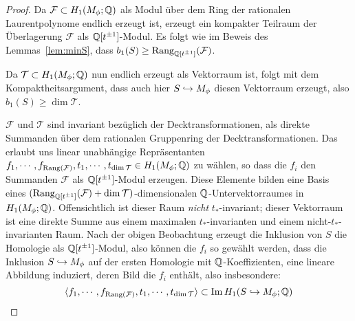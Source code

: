         \begin{proof} 
        Da $\mathcal F \subset H_1(M_\phi;\mathbb{Q})$ als Modul über dem Ring der rationalen Laurentpolynome endlich erzeugt ist, erzeugt ein kompakter Teilraum der Überlagerung $\mathcal F$ als $\mathbb{Q}[t^{\pm 1}]$-Modul. Es folgt wie im Beweis des Lemmas~\ref{lem:minS}, dass $b_1(S)\geq \operatorname{Rang}_{\mathbb{Q}[t^{\pm 1}]}(\mathcal F)$. 

        Da $\mathcal T \subset H_1(M_\phi;\mathbb{Q})$ nun endlich erzeugt als Vektorraum ist, folgt mit dem Kompaktheitsargument, dass auch hier $S\hookrightarrow M_\phi$ diesen Vektorraum erzeugt, also $b_1(S)\geq \dim \mathcal T$. 

        $\mathcal F$ und $\mathcal T$ sind invariant bezüglich der Decktransformationen, als direkte Summanden über dem rationalen Gruppenring der Decktransformationen. Das erlaubt uns linear unabhängige Repräsentanten $f_1,\cdots,f_{\operatorname{Rang}(\mathcal F)},t_1,\cdots,t_{\dim\mathcal T} \in H_1(M_\phi;\mathbb{Q})$ zu wählen, so dass die $f_i$ den Summanden $\mathcal F$ als $\mathbb{Q}[t^{\pm 1}]$-Modul erzeugen. Diese Elemente bilden eine Basis eines $(\operatorname{Rang}_{\mathbb{Q}[t^{\pm 1}]}(\mathcal F)+\dim\mathcal T)$-dimensionalen $\mathbb{Q}$-Untervektorraumes in $H_1(M_\phi;\mathbb{Q})$.  Offensichtlich ist dieser Raum \emph{nicht} $t_*$-invariant; dieser Vektorraum ist eine direkte Summe aus einem maximalen $t_*$-invarianten und einem nicht-$t_*$-invarianten Raum. Nach der obigen Beobachtung erzeugt die Inklusion von $S$ die Homologie als $\mathbb{Q}[t^{\pm 1}]$-Modul, also können die $f_i$ so gewählt werden, dass die Inklusion $S\hookrightarrow M_\phi$ auf der ersten Homologie mit $\mathbb{Q}$-Koeffizienten, eine lineare Abbildung induziert, deren Bild die $f_i$ enthält, also insbesondere:
        \[
         \langle f_1,\cdots,f_{\operatorname{Rang}(\mathcal F)},t_1,\cdots,t_{\dim\mathcal T} \rangle \subset \operatorname{Im} H_1(S\hookrightarrow M_\phi;\mathbb{Q})    
         \] 
    \end{proof}

